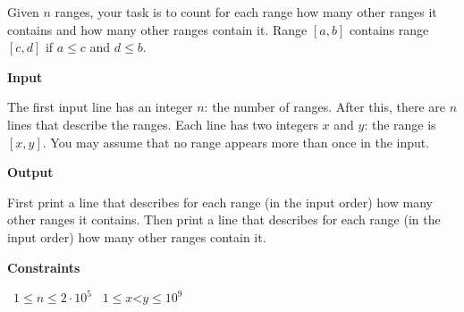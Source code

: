 Given $n$ ranges, your task is to count for each range how many other ranges it contains and how many other ranges contain it.
Range $[a,b]$ contains range $[c,d]$ if $a \le c$ and $d \le b$.

\vspace{0.3cm}\noindent\textbf{Input}

The first input line has an integer $n$: the number of ranges.
After this, there are $n$ lines that describe the ranges. Each line has two integers $x$ and $y$: the range is $[x,y]$.
You may assume that no range appears more than once in the input.

\vspace{0.3cm}\noindent\textbf{Output}

First print a line that describes for each range (in the input order) how many other ranges it contains.
Then print a line that describes for each range (in the input order) how many other ranges contain it.

\vspace{0.3cm}\noindent\textbf{Constraints}

\textbullet\ $1 \le n \le 2 \cdot 10^5$
\textbullet\ $1 \le x $<$ y \le 10^9$